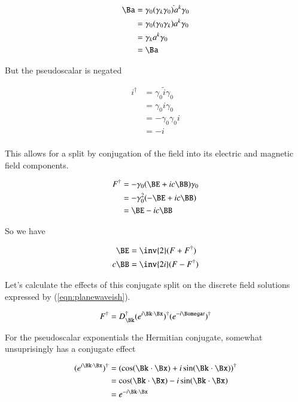 \begin{align*}
\Ba 
&= \gamma_0 (\gamma_k \gamma_0)^{\tilde{}} a^k \gamma_0 \\
&= \gamma_0 (\gamma_0 \gamma_k) a^k \gamma_0 \\
&= \gamma_k a^k \gamma_0 \\
&= \Ba
\end{align*}

But the pseudoscalar is negated

\begin{align*}
i^\dagger 
&=
\gamma_0 \tilde{i} \gamma_0 \\
&=
\gamma_0 i \gamma_0 \\
&=
-\gamma_0 \gamma_0 i \\
&=
- i \\
\end{align*}

This allows for a split by conjugation of the field into its electric and magnetic field components.

\begin{align*}
F^\dagger
&= -\gamma_0 ( \BE + i c \BB) \gamma_0 \\
&= -\gamma_0^2 ( -\BE + i c \BB) \\
&= \BE - i c\BB \\
\end{align*}

So we have 

\begin{align}
\BE &= \inv{2}(F + F^\dagger) \\
c \BB &= \inv{2i}(F - F^\dagger)
\end{align}

Let's calculate the effects of this conjugate split on the discrete field solutions expressed by 
(\ref{eqn:planewaveish}).

\begin{align*}
F^\dagger &= D_\Bk^\dagger (e^{i \Bk \cdot \Bx})^\dagger (e^{-i\Bomega t})^\dagger \\
\end{align*}

For the pseudoscalar exponentials the Hermitian conjugate, somewhat unsuprisingly has a conjugate effect

\begin{align*}
(e^{i \Bk \cdot \Bx})^\dagger
&= 
(\cos(\Bk \cdot \Bx) +i\sin(\Bk \cdot \Bx))^\dagger \\
&= 
\cos(\Bk \cdot \Bx) -i\sin(\Bk \cdot \Bx) \\
&= 
e^{-i\Bk \cdot \Bx}
\end{align*}

